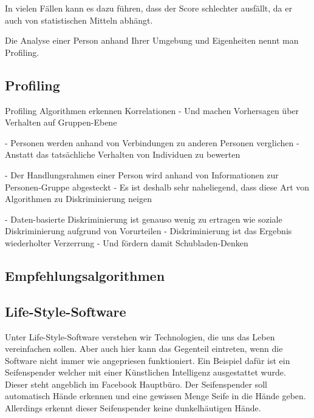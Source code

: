 In vielen Fällen kann es dazu führen, dass der Score schlechter ausfällt, da er auch von statistischen Mitteln abhängt. \cite{welt2015}


Die Analyse einer Person anhand Ihrer Umgebung und Eigenheiten nennt man Profiling. 

\subsection{Profiling}


Profiling Algorithmen erkennen Korrelationen
- Und machen Vorhersagen über Verhalten auf Gruppen-Ebene

- Personen werden anhand von Verbindungen zu anderen Personen verglichen
- Anstatt das tatsächliche Verhalten von Individuen zu bewerten

- Der Handlungsrahmen einer Person wird anhand von Informationen zur Personen-Gruppe abgesteckt
- Es ist deshalb sehr naheliegend, dass diese Art von Algorithmen zu Diskriminierung neigen

- Daten-basierte Diskriminierung ist genauso wenig zu ertragen wie soziale Diskriminierung aufgrund von Vorurteilen
- Diskriminierung ist das Ergebnis wiederholter Verzerrung
- Und fördern damit Schubladen-Denken 

\subsection{Empfehlungsalgorithmen}


\subsection{Life-Style-Software}

Unter Life-Style-Software verstehen wir Technologien, die uns das Leben vereinfachen sollen. Aber auch hier kann das Gegenteil eintreten, wenn die Software nicht immer wie angepriesen funktioniert. 
Ein Beispiel dafür ist ein Seifenspender welcher mit einer Künstlichen Intelligenz ausgestattet wurde. Dieser steht angeblich im Facebook Hauptbüro. 
Der Seifenspender soll automatisch Hände erkennen und eine gewissen Menge Seife in die Hände geben. Allerdings erkennt dieser Seifenspender keine dunkelhäutigen Hände. \newline 

